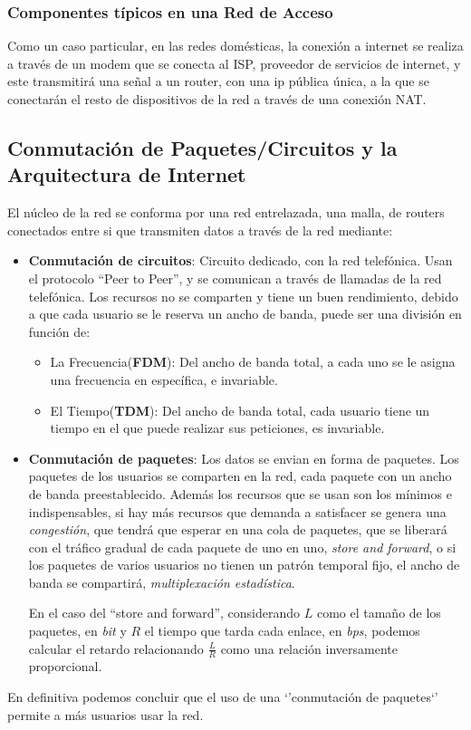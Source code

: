 \subsubsection{Componentes típicos en una Red de Acceso}
\noindent Como un caso particular, en las redes domésticas, la conexión a internet se realiza a través de un modem que se conecta al ISP, proveedor de servicios de internet, y este transmitirá una señal a un router, con una ip pública única, a la que se conectarán el resto de dispositivos de la red a través de una conexión NAT.
\subsection{Conmutación de Paquetes/Circuitos y la Arquitectura de Internet}
\noindent El núcleo de la red se conforma por una red entrelazada, una malla, de routers conectados entre si que transmiten datos a través de la red mediante:
\begin{itemize}
        \item \textbf{Conmutación de circuitos}: Circuito dedicado, con la red telefónica. Usan el protocolo ``Peer to Peer'', y se comunican a través de llamadas de la red telefónica. Los recursos no se comparten y tiene un buen rendimiento, debido a que cada usuario se le reserva un ancho de banda, puede ser una división en función de:
              \begin{itemize}
                      \item La Frecuencia(\textbf{FDM}): Del ancho de banda total, a cada uno se le asigna una frecuencia en específica, e invariable.
                      \item El Tiempo(\textbf{TDM}): Del ancho de banda total, cada usuario tiene un tiempo en el que puede realizar sus peticiones, es invariable.
              \end{itemize}
        \item \textbf{Conmutación de paquetes}: Los datos se envian en forma de paquetes. Los paquetes de los usuarios se comparten en la red, cada paquete con un ancho de banda preestablecido. Además los recursos que se usan son los mínimos e indispensables, si hay más recursos que demanda a satisfacer se genera una \textit{congestión}, que tendrá que esperar en una cola de paquetes, que se liberará con el tráfico gradual de cada paquete de uno en uno, \textit{store and forward}, o si los paquetes de varios usuarios no tienen un patrón temporal fijo, el ancho de banda se compartirá, \textit{multiplexación estadística}.\par \noindent En el caso del ``store and forward'', considerando \(L\) como el tamaño de los paquetes, en \textit{bit} y \(R\) el tiempo que tarda cada enlace, en \textit{bps}, podemos calcular el retardo relacionando \(\frac{L}{R}\) como una relación inversamente proporcional.
\end{itemize}
\noindent En definitiva podemos concluir que el uso de una `'conmutación de paquetes`' permite a más usuarios usar la red.
